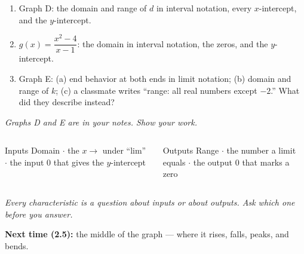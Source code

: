 \documentclass[aspectratio=169, 11pt]{beamer}
\begin{document}
\begin{frame}[t, plain]

  \begin{enumerate}\setlength{\itemsep}{10pt}
    \setcounter{enumi}{16}
    \item Graph D: the domain and range of \(d\) in interval notation, every
          \(x\)-intercept, and the \(y\)-intercept.
    \item \(g(x) = \dfrac{x^2 - 4}{x - 1}\): the domain in interval notation, the zeros, and
          the \(y\)-intercept.
    \item Graph E: (a) end behavior at both ends in limit notation; (b) domain and range of
          \(k\); (c) a classmate writes ``range: all real numbers except \(-2\).'' What did
          they describe instead?
  \end{enumerate}

  \bigskip
  \textit{Graphs D and E are in your notes. Show your work.}
\end{frame}

\begin{frame}[t, plain]

  \begin{columns}[T]
      \begin{block}{Inputs}
        Domain $\cdot$ the \(x \to\) under ``lim'' $\cdot$ the input 0 that gives the
        \(y\)-intercept
      \end{block}
      \begin{block}{Outputs}
        Range $\cdot$ the number a limit equals $\cdot$ the output 0 that marks a zero
      \end{block}
  \end{columns}

  \bigskip
  \begin{center}
    \large\textit{Every characteristic is a question about inputs or about outputs. Ask which
    one before you answer.}
  \end{center}

  \bigskip
  \textbf{Next time (2.5):} the middle of the graph --- where it rises, falls, peaks, and
  bends.
\end{frame}
\end{document}
